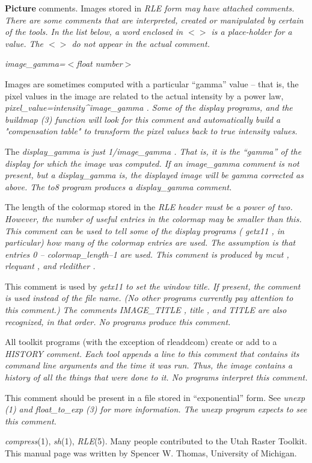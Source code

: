{\bf Picture} comments.
Images stored in %
\it RLE \rm%
form may have attached comments.  There are
some comments that are interpreted, created or manipulated by certain
of the tools.  In the list below, a word enclosed in $<$$>$ is a
place-holder for a value.  The $<$$>$ do not appear in the actual comment.
\begin{TPlist}{%
\it image\_gamma=$<$float number$>$\rm%
}
\item[{%
\it image\_gamma=$<$float number$>$\rm%
}]
Images are sometimes computed with a particular ``gamma'' value --
that is, the pixel values in the image are related to the actual
intensity by a power law, %
\it pixel\_value=intensity\^{}image\_gamma\rm%
.
Some of the display programs, and the %
\it buildmap\rm%
(3) function will
look for this comment and automatically build a "compensation table"
to transform the pixel values back to true intensity values.
\item[{%
\it display\_gamma=$<$float number$>$\rm%
}]
The %
\it display\_gamma \rm%
is just %
\it 1/image\_gamma\rm%
.  That is, it is
the ``gamma'' of the display for which the image was computed.  If an
%
\it image\_gamma \rm%
comment is not present, but a %
\it display\_gamma \rm%
is, the displayed image will be gamma corrected as above.  The
%
\it to8 \rm%
program produces a %
\it display\_gamma \rm%
comment.
\item[{%
\it colormap\_length=$<$integer$>$\rm%
}]
The length of the colormap stored in the %
\it RLE \rm%
header must be a
power of two.  However, the number of useful entries in the colormap
may be smaller than this.  This comment can be used to tell some
of the display programs (%
\it getx11\rm%
, in particular) how many of
the colormap entries are used.  The assumption is that entries 0 --
%
\it colormap\_length--1 \rm%
are used.  This comment is produced by
%
\it mcut\rm%
, %
\it rlequant\rm%
, and %
\it rledither\rm%
.
\item[{%
\it image\_title=$<$string$>$\rm%
}]
This comment is used by %
\it getx11 \rm%
to set the window title.  If
present, the comment is used instead of the file name.  (No other
programs currently pay attention to this comment.)  The comments
%
\it IMAGE\_TITLE\rm%
, %
\it title\rm%
, and %
\it TITLE \rm%
are also recognized,
in that order.  No programs produce this comment.
\item[{%
\it HISTORY=$<$string$>$\rm%
}]
All toolkit programs (with the exception of rleaddcom) create or add
to a %
\it HISTORY \rm%
comment.  Each tool appends a line to this comment
that contains its command line arguments and the time it was run.
Thus, the image contains a history of all the things that were done to
it.  No programs interpret this comment.
\item[{%
\it exponential\_data\rm%
}]
This comment should be present in a file stored in ``exponential''
form.  See %
\it unexp\rm%
(1) and %
\it float\_to\_exp\rm%
(3) for more
information.  The %
\it unexp \rm%
program expects to see this comment.
\end{TPlist}
{\it compress}{\rm (1),}
{\it sh}{\rm (1),}
{\it RLE}{\rm (5).}
Many people contributed to the Utah Raster Toolkit.  This manual page
was written by Spencer W. Thomas, University of Michigan.

